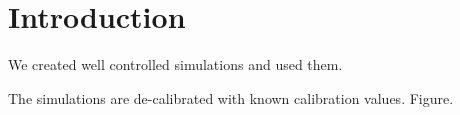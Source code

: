 \section{Introduction}
\label{sec:introduction}

We created well controlled simulations and used them.

The simulations are de-calibrated with known calibration values.
Figure.
